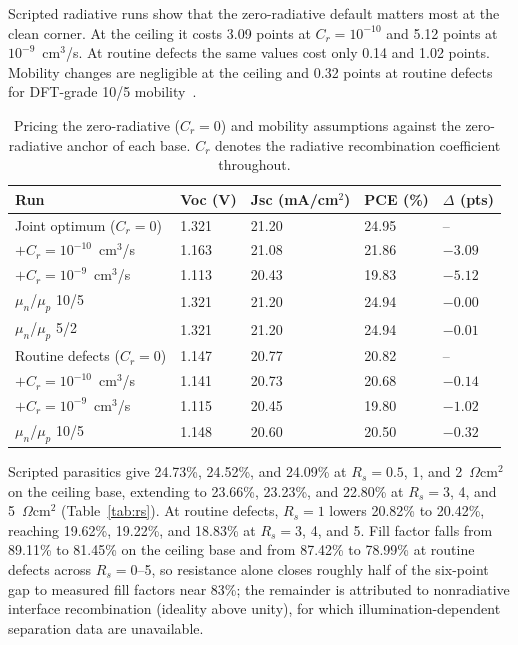 \documentclass[11pt,a4paper]{article}
\begin{document}
Scripted radiative runs show that the zero-radiative default matters most at the clean corner. At the ceiling it costs 3.09 points at $C_r=10^{-10}$ and 5.12 points at $10^{-9}$~cm$^3$/s. At routine defects the same values cost only 0.14 and 1.02 points. Mobility changes are negligible at the ceiling and 0.32 points at routine defects for DFT-grade 10/5 mobility~\cite{Motta2015}.

\begin{table}[tbp]
\centering
\caption{Pricing the zero-radiative ($C_r=0$) and mobility assumptions against the zero-radiative anchor of each base. $C_r$ denotes the radiative recombination coefficient throughout.}
\label{tab:krad}
\begin{tabular}{|l|l|l|l|l|}
\hline\hline
Run & Voc (V) & Jsc (mA/cm$^2$) & PCE (\%) & $\Delta$ (pts) \\
\hline
Joint optimum ($C_r=0$) & 1.321 & 21.20 & 24.95 & \mbox{--} \\
$+C_r=10^{-10}$~cm$^3$/s & 1.163 & 21.08 & 21.86 & $-3.09$ \\
$+C_r=10^{-9}$~cm$^3$/s & 1.113 & 20.43 & 19.83 & $-5.12$ \\
$\mu_n$/$\mu_p$ 10/5 & 1.321 & 21.20 & 24.94 & $-0.00$ \\
$\mu_n$/$\mu_p$ 5/2 & 1.321 & 21.20 & 24.94 & $-0.01$ \\
Routine defects ($C_r=0$) & 1.147 & 20.77 & 20.82 & \mbox{--} \\
$+C_r=10^{-10}$~cm$^3$/s & 1.141 & 20.73 & 20.68 & $-0.14$ \\
$+C_r=10^{-9}$~cm$^3$/s & 1.115 & 20.45 & 19.80 & $-1.02$ \\
$\mu_n$/$\mu_p$ 10/5 & 1.148 & 20.60 & 20.50 & $-0.32$ \\
\hline\hline
\end{tabular}
\end{table}

Scripted parasitics give 24.73\%, 24.52\%, and 24.09\% at $R_s=0.5$, 1, and 2~$\Omega$cm$^2$ on the ceiling base, extending to 23.66\%, 23.23\%, and 22.80\% at $R_s=3$, 4, and 5~$\Omega$cm$^2$ (Table~\ref{tab:rs}). At routine defects, $R_s=1$ lowers 20.82\% to 20.42\%, reaching 19.62\%, 19.22\%, and 18.83\% at $R_s=3$, 4, and 5. Fill factor falls from 89.11\% to 81.45\% on the ceiling base and from 87.42\% to 78.99\% at routine defects across $R_s=0$--5, so resistance alone closes roughly half of the six-point gap to measured fill factors near 83\%; the remainder is attributed to nonradiative interface recombination (ideality above unity), for which illumination-dependent separation data are unavailable.
\end{document}
